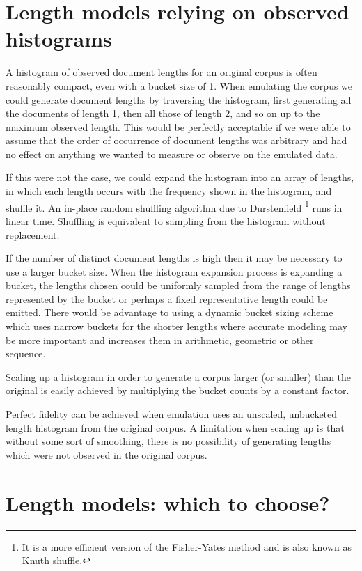 \documentclass[11pt]{report}
\begin{document}
\section{Length models relying on observed histograms}
A histogram of observed document lengths for an original corpus is often
reasonably compact, even with a bucket size of 1.  When emulating the
corpus we could generate document lengths by traversing the histogram,
first generating all the documents of length 1, then all those of
length 2, and so on up to the maximum observed length.   This would be
perfectly acceptable if we were able to assume that the order of
occurrence of document lengths was arbitrary and had no effect on
anything we wanted to measure or observe on the emulated data.

If this were not the case, we could expand the histogram into an
array of lengths, in which each length occurs with the frequency
shown in the histogram, and shuffle it.  An in-place random shuffling algorithm
due to Durstenfield \cite{Durstenfeld1964}\footnote{It is a more
  efficient version of the Fisher-Yates method and is also known as
  Knuth shuffle.} runs in linear time.  Shuffling is equivalent to
sampling from the histogram without replacement.

If the number of distinct document lengths is high then it may be
necessary to use a larger bucket size.  When the histogram expansion
process is expanding a bucket, the lengths chosen could be uniformly sampled from the
range of lengths represented by the bucket or perhaps a fixed
representative length could be emitted.   There would be advantage to
using a dynamic bucket sizing scheme which uses narrow buckets for the
shorter lengths where accurate modeling may be more important and
increases them in arithmetic, geometric or other sequence.

Scaling up a histogram in order to generate a corpus larger (or
smaller) than the original is easily achieved by multiplying the
bucket counts by a constant factor.

Perfect fidelity can be achieved when emulation uses an unscaled,
unbucketed length histogram from the original corpus. A limitation
when scaling up is that without some sort of smoothing, there is no
possibility of generating lengths which were not observed in the
original corpus.

\section{Length models: which to choose?}
\end{document}
